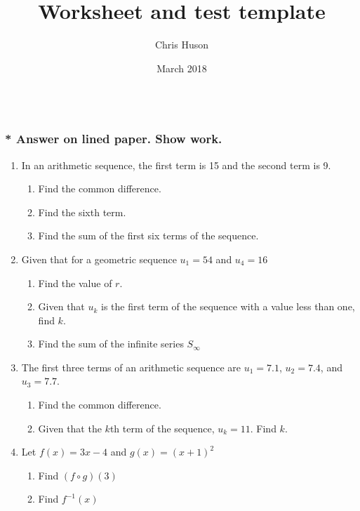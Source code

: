 \documentclass[12pt, oneside]{article}
\title{Worksheet and test template}
\author{Chris Huson}
\date{March 2018}
\begin{document}
\subsubsection*{\\* Answer on lined paper. Show work.}

\begin{enumerate}

\vspace{0.5 cm}


\item In an arithmetic sequence, the first term is 15 and the second term is 9.
\begin{enumerate}
    \item Find the common difference.
    \item Find the sixth term.
    \item Find the sum of the first six terms of the sequence.
\end{enumerate}

\item Given that for a geometric sequence $u_1=54$ and $u_4=16$
\begin{enumerate}
    \item Find the value of $r$.
    \item Given that $u_k$ is the first term of the sequence with a value less than one, find $k$.
    \item Find the sum of the infinite series $S_\infty$
\end{enumerate}

\item The first three terms of an arithmetic sequence are $u_1=7.1$, $u_2=7.4$, and $u_3=7.7$.
\begin{enumerate}
    \item Find the common difference.
    \item Given that the $k$th term of the sequence, $u_k=11$. Find $k$.
\end{enumerate}


\item Let $f(x) = 3x -4$ and $g(x)=(x+1)^2$
\begin{enumerate}
    \item Find $(f \circ g)(3)$
    \item Find $f^{-1}(x)$
\end{enumerate}



\end{enumerate}
\end{document}
